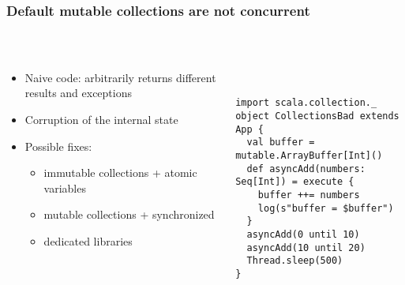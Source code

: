 \documentclass[aspectratio=169]{beamer}
\begin{document}
\begin{frame}[fragile]\frametitle{Default mutable collections are not concurrent}


~\\[-8mm]
\begin{columns}
\begin{column}{0.48\textwidth}
\begin{itemize}
  \item Naive code: arbitrarily returns different results and exceptions
  \item Corruption of the internal state
  \item Possible fixes:
    \begin{itemize}
      \item immutable collections + atomic variables
      \\
      \item mutable collections + synchronized
      \\
      \item dedicated libraries
      \\
    \end{itemize}
\end{itemize}
\end{column}
\begin{column}{0.54\textwidth}
~\\
\begin{lstlisting}[emph={execute,sleep,log,compareAndSet,asyncAdd}]
import scala.collection._
object CollectionsBad extends App {
  val buffer = mutable.ArrayBuffer[Int]()
  def asyncAdd(numbers: Seq[Int]) = execute {
    buffer ++= numbers
    log(s"buffer = $buffer")
  }
  asyncAdd(0 until 10)
  asyncAdd(10 until 20)
  Thread.sleep(500)
}
\end{lstlisting}
\end{column}
\end{columns}
\end{frame}
\end{document}
